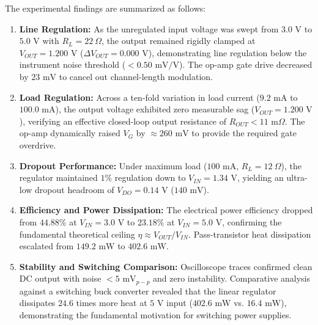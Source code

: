 \documentclass[11pt,a4paper]{article}
\begin{document}
The experimental findings are summarized as follows:
\begin{enumerate}
    \item \textbf{Line Regulation:} As the unregulated input voltage was swept from $3.0\text{ V}$ to $5.0\text{ V}$ with $R_L = 22\ \Omega$, the output remained rigidly clamped at $V_{OUT} = 1.200\text{ V}$ ($\Delta V_{OUT} = 0.000\text{ V}$), demonstrating line regulation below the instrument noise threshold ($< 0.50\text{ mV/V}$). The op-amp gate drive decreased by $23\text{ mV}$ to cancel out channel-length modulation.
    \item \textbf{Load Regulation:} Across a ten-fold variation in load current ($9.2\text{ mA}$ to $100.0\text{ mA}$), the output voltage exhibited zero measurable sag ($V_{OUT} = 1.200\text{ V}$), verifying an effective closed-loop output resistance of $R_{OUT} < 11\text{ m}\Omega$. The op-amp dynamically raised $V_G$ by $\approx 260\text{ mV}$ to provide the required gate overdrive.
    \item \textbf{Dropout Performance:} Under maximum load ($100\text{ mA}$, $R_L = 12\ \Omega$), the regulator maintained $1\%$ regulation down to $V_{IN} = 1.34\text{ V}$, yielding an ultra-low dropout headroom of $V_{DO} = 0.14\text{ V}$ ($140\text{ mV}$).
    \item \textbf{Efficiency and Power Dissipation:} The electrical power efficiency dropped from $44.88\%$ at $V_{IN} = 3.0\text{ V}$ to $23.18\%$ at $V_{IN} = 5.0\text{ V}$, confirming the fundamental theoretical ceiling $\eta \approx V_{OUT} / V_{IN}$. Pass-transistor heat dissipation escalated from $149.2\text{ mW}$ to $402.6\text{ mW}$.
    \item \textbf{Stability and Switching Comparison:} Oscilloscope traces confirmed clean DC output with noise $< 5\text{ mV}_{p-p}$ and zero instability. Comparative analysis against a switching buck converter revealed that the linear regulator dissipates $24.6$ times more heat at $5\text{ V}$ input ($402.6\text{ mW}$ vs. $16.4\text{ mW}$), demonstrating the fundamental motivation for switching power supplies.
\end{enumerate}
\end{document}
